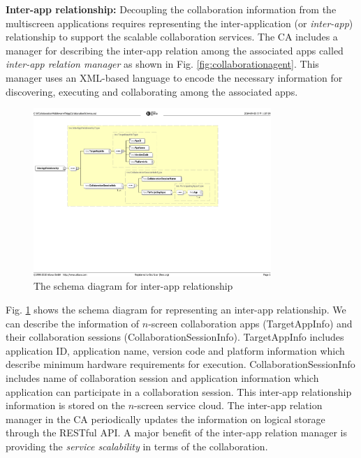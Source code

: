 \documentclass[conference]{IEEEtran}
\begin{document}
\noindent
\textbf{Inter-app relationship:}
Decoupling the collaboration information from the multiscreen applications requires representing the inter-application (or \textit{inter-app}) relationship to support the scalable collaboration services. The CA includes a manager for describing the inter-app relation among the associated apps called \textit{inter-app relation manager} as shown in Fig. \ref{fig:collaborationagent}. This manager uses an XML-based language to encode the necessary information for discovering, executing and collaborating among the associated apps. 

\begin{figure}[htb] %
\centering
\includegraphics[width=9cm,keepaspectratio]{interapprelationscheme}
\caption{The schema diagram for inter-app relationship}
\label{fig:interapprelation}
\end{figure}

Fig. \ref{fig:interapprelation} shows the schema diagram for representing an inter-app relationship. We can describe the information of $n$-screen collaboration apps ({\small \sffamily TargetAppInfo}) and their collaboration sessions ({\small \sffamily CollaborationSessionInfo}). {\small \sffamily TargetAppInfo} includes application ID, application name, version code and platform information which describe minimum hardware requirements for execution.
{\small \sffamily CollaborationSessionInfo} includes name of collaboration session and application information which application can participate in a collaboration session. 
This inter-app relationship information is stored on the $n$-screen service cloud. The inter-app relation manager in the CA periodically updates the information on logical storage through the RESTful API.
A major benefit of the inter-app relation manager is providing the \textit{service scalability} in terms of the collaboration.
\end{document}
